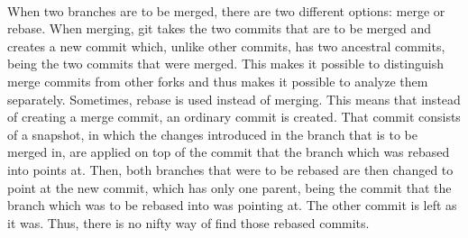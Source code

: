 \paragraph*{}
When two branches are to be merged, there are two different options: merge or rebase. When merging, git takes the two commits that are to be merged and creates a new commit which, unlike other commits, has two ancestral commits, being the two commits that were merged. This makes it possible to distinguish merge commits from other forks and thus makes it possible to analyze them separately. Sometimes, rebase is used instead of merging. This means that instead of creating a merge commit, an ordinary commit is created. That commit consists of a snapshot, in which the changes introduced in the branch that is to be merged in, are applied on top of the commit that the branch which was rebased into points at. Then, both branches that were to be rebased are then changed to point at the new commit, which has only one parent, being the commit that the branch which was to be rebased into was pointing at. The other commit is left as it was. Thus, there is no nifty way of find those rebased commits.
